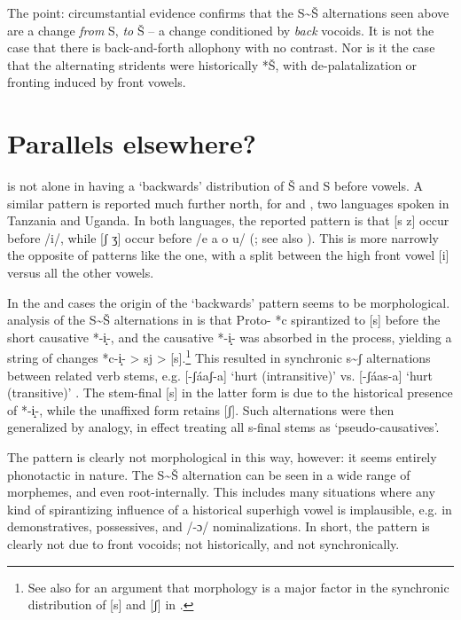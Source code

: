 The point: circumstantial evidence confirms that the S{\textasciitilde}Š alternations seen above are a change \textit{from} S, \textit{to} Š – a change conditioned by \textit{back} vocoids. It is not the case that there is back-and-forth allophony with no contrast. Nor is it the case that the alternating stridents were historically *Š, with de-palatalization or fronting induced by front vowels. 

\section{Parallels elsewhere?}\label{sec:bennett:3}

 is not alone in having a ‘backwards’ distribution of Š and S before vowels. A similar pattern is reported much further north, for  and , two  languages spoken in Tanzania and Uganda. In both languages, the reported pattern is that [s z] occur before /i/, while [ʃ ʒ] occur before /e a o u/ (\citealt{Byarushengo1975,Hyman2003b}; see also \citealt{Hansson2001,Hansson2010}). This is more narrowly the opposite of patterns like the  one, with a split between the high front vowel [i] versus all the other vowels.

In the  and  cases the origin of the ‘backwards’ pattern seems to be morphological.  analysis of the S{\textasciitilde}Š alternations in  is that Proto- *c spirantized to [s] before the short causative *-i̝-, and the causative *-i̝- was absorbed in the process, yielding a string of changes *c-i̝- > sj > [s].\footnote{See also \citet{Bennett&Pulleyblank:2014} for an argument that morphology is a major factor in the synchronic distribution of [s] and [ʃ] in .} This resulted in synchronic s{\textasciitilde}ʃ alternations between related verb stems, e.g. [-ʃáaʃ-a] ‘hurt (intransitive)’ vs. [-ʃáas-a] ‘hurt (transitive)’ \citep[85]{Hyman2003b}. The stem-final [s] in the latter form is due to the historical presence of *-i̝-, while the unaffixed form retains [ʃ]. Such alternations were then generalized by analogy, in effect treating all s-final stems as ‘pseudo-causatives’.

The  pattern is clearly not morphological in this way, however: it seems entirely phonotactic in nature. The S{\textasciitilde}Š alternation can be seen in a wide range of morphemes, and even root-internally. This includes many situations where any kind of spirantizing influence of a historical superhigh vowel is implausible, e.g. in demonstratives, possessives, and /-ɔ/ nominalizations. In short, the  pattern is clearly not due to front vocoids; not historically, and not synchronically.

